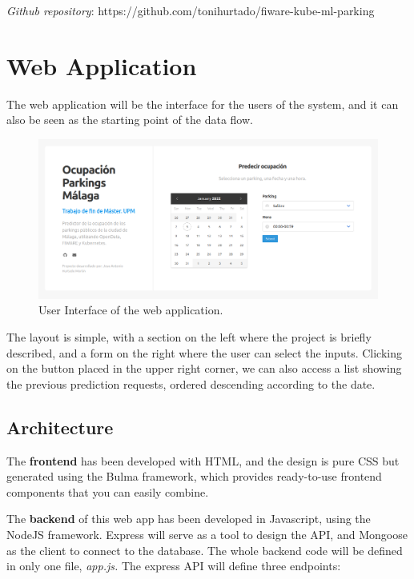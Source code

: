 \textit{Github repository}: https://github.com/tonihurtado/fiware-kube-ml-parking

\section{Web Application}
\label{section:WebApp}

The web application will be the interface for the users of the system, and it can also be seen as the starting point of the data flow.

\begin{figure}[H]
	\centering
	\includegraphics[width=1\linewidth]{imagenes/website.png}
	\caption{User Interface of the web application.}
	\label{website}
\end{figure}

The layout is simple, with a section on the left where the project is briefly described, and a form on the right where the user can select the inputs. Clicking on the button placed in the upper right corner, we can also access a list showing the previous prediction requests, ordered descending according to the date.

\subsection{Architecture}
\label{section:WebAppArchitecture}

The \textbf{frontend} has been developed with HTML, and the design is pure CSS but generated using the Bulma framework, which provides ready-to-use frontend components that you can easily combine.

The \textbf{backend} of this web app has been developed in Javascript, using the NodeJS framework. Express will serve as a tool to design the API, and Mongoose as the client to connect to the database. The whole backend code will be defined in only one file, \textit{app.js.} The express API will define three endpoints: 


